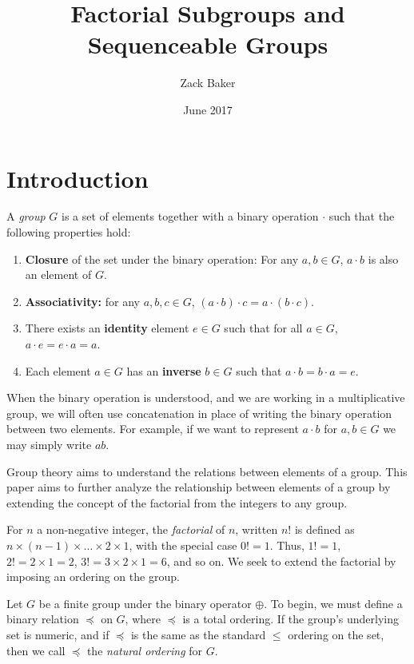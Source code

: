 \documentclass{article}
\title{Factorial Subgroups and Sequenceable Groups}
\author{Zack Baker }
\date{June 2017}
\begin{document}
\maketitle

\section{Introduction}

A \textit{group} $G$ is a set of elements together with a binary operation $\cdot$ such that the following properties hold:
\begin{enumerate}
\item \textbf{Closure} of the set under the binary operation: For any $a,b\in G$, $a\cdot b$ is also an element of $G$.
\item \textbf{Associativity:} for any $a,b,c\in G$, $(a\cdot b)\cdot c = a\cdot(b\cdot c)$.
\item There exists an \textbf{identity} element $e \in G$ such that for all $a\in G$, $a\cdot e = e\cdot a = a$.
\item Each element $a\in G$ has an \textbf{inverse} $b\in G$ such that $a\cdot b=b\cdot a = e$.
\end{enumerate}

When the binary operation is understood, and we are working in a multiplicative group, we will often use concatenation in place of writing the binary operation between two elements. For example, if we want to represent $a\cdot b$ for $a,b\in G$ we may simply write $ab$.

Group theory aims to understand the relations between elements of a group. This paper aims to further analyze the relationship between elements of a group by extending the concept of the factorial from the integers to any group.

For $n$ a non-negative integer, the \textit{factorial} of $n$, written $n!$ is defined as $n\times (n-1) \times \ldots \times 2 \times 1$, with the special case $0!=1$. Thus, $1! = 1$, $2!=2\times 1 = 2$, $3! = 3\times 2 \times 1 = 6$, and so on. We seek to extend the factorial by imposing an ordering on the group.


Let $G$ be a finite group under the binary operator $\oplus$. To begin, we must define a binary relation $\preceq$ on $G$, where $\preceq$ is a total ordering. If the group's underlying set is numeric, and if $\preceq$ is the same as the standard $\leq$ ordering on the set, then we call $\preceq$ the \textit{natural ordering} for $G$. 
\end{document}

